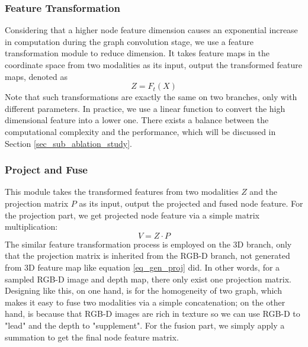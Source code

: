 ﻿\documentclass[journal]{IEEEtran}
\begin{document}
\subsubsection{Feature Transformation} \label{sec_sub_feature_transofrm}
    Considering that a higher node feature dimension causes an exponential increase in computation during the graph convolution stage, we use a feature transformation module to reduce dimension. It takes feature maps in the coordinate space from two modalities as its input, output the transformed feature maps, denoted as
    \begin{equation}
     Z = F_t(X)
    \end{equation}
    Note that such transformations are exactly the same on two branches, only with different parameters. In practice, we use a linear function to convert the high dimensional feature into a lower one. There exists a balance between the computational complexity and the performance, which will be discussed in Section \ref{sec_sub_ablation_study}. 

\subsubsection{Project and Fuse}
       
    This module takes the transformed features from two modalities $Z$ and the projection matrix $P$ as its input, output the projected and fused node feature. For the projection part, we get projected node feature via a simple matrix multiplication:
    \begin{equation} 
        V = Z \cdot P
        \label{eq_node_embedding}
    \end{equation}
    The similar feature transformation process is employed on the 3D branch, only that the projection matrix is inherited from the RGB-D branch, not generated from 3D feature map like equation \ref{eq_gen_proj} did. In other words, for a sampled RGB-D image and depth map, there only exist one projection matrix. Designing like this, on one hand, is for the homogeneity of two graph, which makes it easy to fuse two modalities via a simple concatenation; on the other hand, is because that RGB-D images are rich in texture so we can use RGB-D to "lead" and the depth to "supplement". For the fusion part, we simply apply a summation to get the final node feature matrix.  \\

    
   
\end{document}
